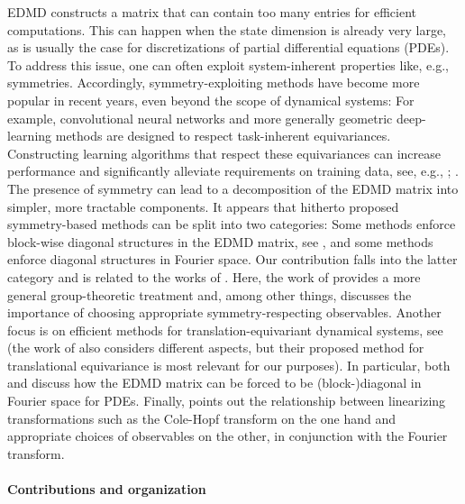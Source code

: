 \documentclass[preprint,12pt,authoryear]{elsarticle}
\begin{document}
EDMD constructs a matrix that can contain too many entries for efficient computations.
This can happen when the state dimension is already very large, as is usually the case for discretizations of partial differential equations (PDEs). To address this issue, one can often exploit system-inherent properties like, e.g., symmetries. 
Accordingly, symmetry-exploiting methods have become more popular in recent years, even beyond the scope of dynamical systems: %
For example, convolutional neural networks and more generally geometric deep-learning methods \cite{BBCV21} are designed to respect task-inherent equivariances. 
Constructing learning algorithms that respect these equivariances can increase performance and significantly alleviate requirements on training data, see, e.g., \cite{MBB+15,CW16,BBL+17,AGS21,BBCV21,HRV+24}; \cite{dierkes2023hamiltonian}.
The presence of symmetry can lead to a decomposition of the EDMD matrix into simpler, more tractable components. It appears that hitherto proposed symmetry-based methods can be split into two categories: Some methods enforce block-wise diagonal structures in the EDMD matrix, see \cite{sinha2020koopman,PHN+24}, and some methods enforce diagonal structures in Fourier space. Our contribution falls into the latter category and is related to the works of \cite{salovaKoopmanOperatorIts2019,baddooPhysicsinformedDynamicMode2023,hochrainerApproximationTranslationInvariant2024b,nathan2018applied}. Here, the work of \cite{salovaKoopmanOperatorIts2019} provides a more general group-theoretic treatment and, among other things, discusses the importance of choosing appropriate symmetry-respecting observables.
Another focus is on efficient methods for translation-equivariant dynamical systems, see \cite{baddooPhysicsinformedDynamicMode2023,hochrainerApproximationTranslationInvariant2024b} (the work of \cite{baddooPhysicsinformedDynamicMode2023} also considers different aspects, but their proposed method for translational equivariance is most relevant for our purposes). 
In particular, both \cite{baddooPhysicsinformedDynamicMode2023} and \cite{hochrainerApproximationTranslationInvariant2024b} discuss how the EDMD matrix can be forced to be (block-)diagonal in Fourier space for PDEs. Finally, \cite{nathan2018applied} points out the relationship between linearizing transformations such as the Cole-Hopf transform on the one hand and appropriate choices of observables on the other, in conjunction with the Fourier transform.

\paragraph{Contributions and organization} 
\end{document}
